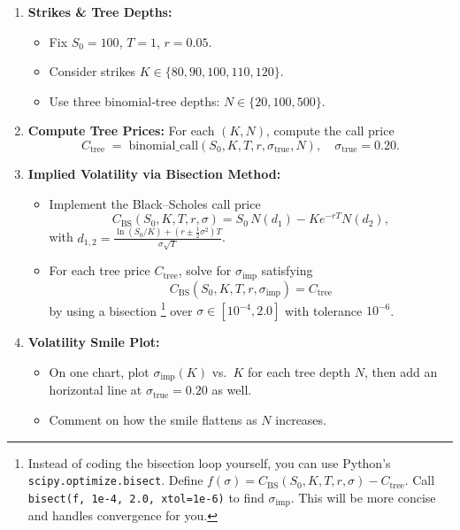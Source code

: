 \begin{enumerate}
  \item \textbf{Strikes \& Tree Depths:}  
    \begin{itemize}
      \item Fix \(S_0=100\), \(T=1\), \(r=0.05\).  
      \item Consider strikes \(K\in\{80,90,100,110,120\}\).  
      \item Use three binomial‐tree depths: \(N\in\{20,100,500\}\).
    \end{itemize}

  \item \textbf{Compute Tree Prices:}  
    For each \((K,N)\), compute the call price  
    \[
      C_{\text{tree}}
      \;=\;\text{binomial\_call}(S_0,K,T,r,\sigma_{\text{true}},N),
      \quad \sigma_{\text{true}}=0.20.
    \]

  \item \textbf{Implied Volatility via Bisection Method:}  
    \begin{itemize}
      \item Implement the Black–Scholes call price
      \[
        C_{\mathrm{BS}}(S_0,K,T,r,\sigma)
        = S_0\,N(d_1) - K e^{-rT} N(d_2),
      \]
      with
      \(\displaystyle d_{1,2} = \frac{\ln(S_0/K)+(r\pm\tfrac12\sigma^2)T}{\sigma\sqrt{T}}\).
      \item For each tree price \(C_{\text{tree}}\), solve for \(\sigma_{\text{imp}}\) satisfying
      \[
        C_{\mathrm{BS}}(S_0,K,T,r,\sigma_{\text{imp}})
        = C_{\text{tree}}
      \]
      by using a bisection \footnote{Instead of coding the bisection loop yourself, you can use Python’s \texttt{scipy.optimize.bisect}. Define \(f(\sigma)=C_{\mathrm{BS}}(S_0,K,T,r,\sigma)-C_{\text{tree}}\). Call \texttt{bisect(f, 1e-4, 2.0, xtol=1e-6)} to find \(\sigma_{\text{imp}}\). This will be more concise and handles convergence for you.} over \(\sigma\in[10^{-4},2.0]\) with tolerance \(10^{-6}\).
    \end{itemize}

  \item \textbf{Volatility Smile Plot:}  
    \begin{itemize}
      \item On one chart, plot \(\sigma_{\text{imp}}(K)\) vs.\ \(K\) for each tree depth \(N\), then add an horizontal line at \(\sigma_{\text{true}}=0.20\) as well.  
      \item Comment on how the smile flattens as \(N\) increases.
    \end{itemize}
\end{enumerate}
